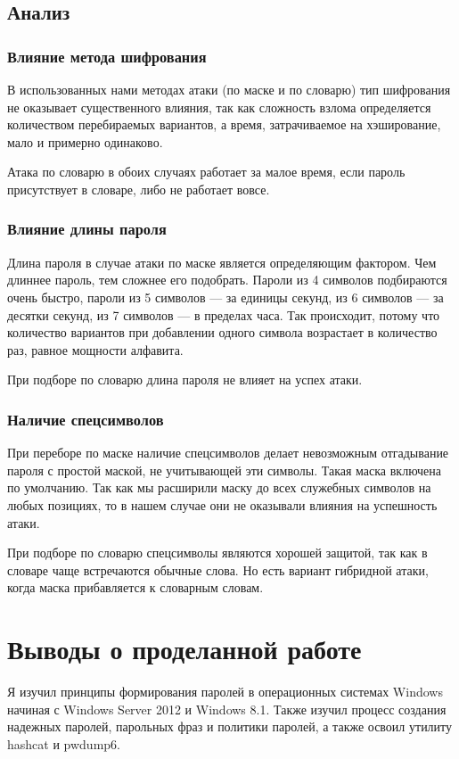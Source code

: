\subsection{Анализ}
\subsubsection{Влияние метода шифрования}
В использованных нами методах атаки (по маске и по словарю) тип шифрования не оказывает существенного влияния, так как сложность взлома определяется количеством перебираемых вариантов, а время, затрачиваемое на хэширование, мало и примерно одинаково.

Атака по словарю в обоих случаях работает за малое время, если пароль присутствует в словаре, либо не работает вовсе.

\subsubsection{Влияние длины пароля}
Длина пароля в случае атаки по маске является определяющим фактором. Чем длиннее пароль, тем сложнее его подобрать. Пароли из 4 символов подбираются очень быстро, пароли из 5 символов — за единицы секунд, из 6 символов — за десятки секунд, из 7 символов — в пределах часа. Так происходит, потому что количество вариантов при добавлении одного символа возрастает в количество раз, равное мощности алфавита.

При подборе по словарю длина пароля не влияет на успех атаки.

\subsubsection{Наличие спецсимволов}
При переборе по маске наличие спецсимволов делает невозможным отгадывание пароля с простой маской, не учитывающей эти символы. Такая маска включена по умолчанию. Так как мы расширили маску до всех служебных символов на любых позициях, то в нашем случае они не оказывали влияния на успешность атаки.

При подборе по словарю спецсимволы являются хорошей защитой, так как в словаре чаще встречаются обычные слова. Но есть вариант гибридной атаки, когда маска прибавляется к словарным словам.


\clearpage

\section{Выводы о проделанной работе}
Я изучил принципы формирования паролей в операционных системах Windows начиная с Windows Server 2012 и Windows 8.1. Также изучил процесс создания надежных паролей, парольных фраз и политики паролей, а также освоил утилиту hashcat и pwdump6.

\clearpage